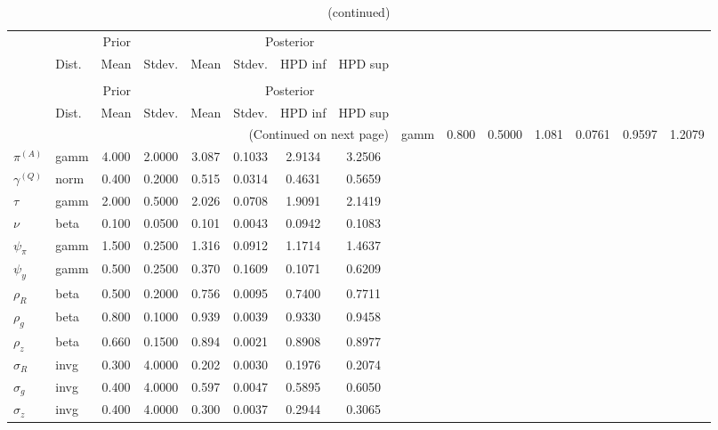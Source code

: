  
\begin{center}
\begin{longtable}{llcccccc} 
\caption{Results from Metropolis-Hastings (parameters)}
 \label{Table:MHPosterior:1}\\
\toprule 
  & \multicolumn{3}{c}{Prior}  &  \multicolumn{4}{c}{Posterior} \\
  \cmidrule(r{.75em}){2-4} \cmidrule(r{.75em}){5-8}
  & Dist. & Mean  & Stdev. & Mean & Stdev. & HPD inf & HPD sup\\
\midrule \endfirsthead 
\caption{(continued)}\\\toprule 
  & \multicolumn{3}{c}{Prior}  &  \multicolumn{4}{c}{Posterior} \\
  \cmidrule(r{.75em}){2-4} \cmidrule(r{.75em}){5-8}
  & Dist. & Mean  & Stdev. & Mean & Stdev. & HPD inf & HPD sup\\
\midrule \endhead 
\bottomrule \multicolumn{8}{r}{(Continued on next page)} \endfoot 
\bottomrule \endlastfoot 
${r_{A}}$ & gamm &   0.800 & 0.5000 &   1.081& 0.0761 &  0.9597 &  1.2079 \\ 
${\pi^{(A)}}$ & gamm &   4.000 & 2.0000 &   3.087& 0.1033 &  2.9134 &  3.2506 \\ 
${\gamma^{(Q)}}$ & norm &   0.400 & 0.2000 &   0.515& 0.0314 &  0.4631 &  0.5659 \\ 
${\tau}$ & gamm &   2.000 & 0.5000 &   2.026& 0.0708 &  1.9091 &  2.1419 \\ 
${\nu}$ & beta &   0.100 & 0.0500 &   0.101& 0.0043 &  0.0942 &  0.1083 \\ 
${\psi_\pi}$ & gamm &   1.500 & 0.2500 &   1.316& 0.0912 &  1.1714 &  1.4637 \\ 
${\psi_y}$ & gamm &   0.500 & 0.2500 &   0.370& 0.1609 &  0.1071 &  0.6209 \\ 
${\rho_R}$ & beta &   0.500 & 0.2000 &   0.756& 0.0095 &  0.7400 &  0.7711 \\ 
${\rho_{g}}$ & beta &   0.800 & 0.1000 &   0.939& 0.0039 &  0.9330 &  0.9458 \\ 
${\rho_z}$ & beta &   0.660 & 0.1500 &   0.894& 0.0021 &  0.8908 &  0.8977 \\ 
${\sigma_R}$ & invg &   0.300 & 4.0000 &   0.202& 0.0030 &  0.1976 &  0.2074 \\ 
${\sigma_{g}}$ & invg &   0.400 & 4.0000 &   0.597& 0.0047 &  0.5895 &  0.6050 \\ 
${\sigma_z}$ & invg &   0.400 & 4.0000 &   0.300& 0.0037 &  0.2944 &  0.3065 \\ 
\end{longtable}
 \end{center}
